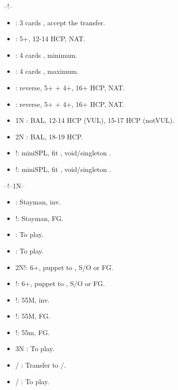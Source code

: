 \documentclass[12pt,twoside,a5paper]{report}%
\begin{document}
	--!--
	\begin{itemize}
	\renewcommand{\labelitemi}{}
	\item {} : 3 cards \sp{}, accept the transfer.
	\item {} : 5+\cl{}, 12-14 HCP, NAT.
	\item {} : 4 cards \sp{}, minimum.
	\item {} : 4 cards \sp{}, maximum.
	\item {} :  reverse, 5+\cl{} + 4+\di{}, 16+ HCP, NAT.
	\item {} :  reverse, 5+\cl{} + 4+\he{}, 16+ HCP, NAT.
	\item 1N : BAL, 12-14 HCP (VUL), 15-17 HCP (notVUL).
	\item 2N : BAL, 18-19 HCP.	
	\item {}!: miniSPL, fit \sp{}, void/singleton \di{}.
	\item {}!: miniSPL, fit \sp{}, void/singleton \he{}.
	\end{itemize}

	--!--1N--%
	\begin{itemize}
	\renewcommand{\labelitemi}{}
	\item {} : Stayman, inv.
	\item {}!: Stayman, FG.
	\item {} : To play.
	\item {} : To play.
	\item 2N!: 6+\cl{}, puppet to , S/O or FG.
	\item {}!: 6+\di{}, puppet to , S/O or FG.
	\item {}!: 55M, inv.
	\item {}!: 55M, FG.
	\item {}!: 55m, FG.
	\item 3N : To play.
	\item {}/ : Transfer to /\sp{}.
	\item {}/ : To play.
	\end{itemize}

\end{document}
